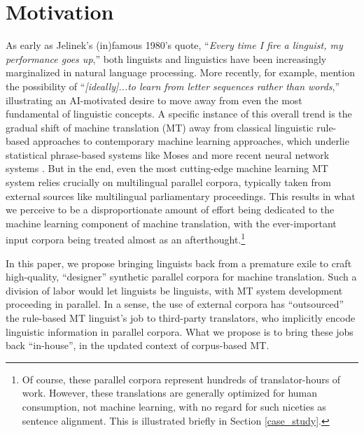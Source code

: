 \section{Motivation} 

As early as Jelinek's (in)famous 1980's quote, ``{\em Every time I fire a linguist, my performance goes up},'' both linguists and linguistics have been increasingly marginalized in natural language processing. 
More recently, for example,  mention the possibility of ``{\em [ideally]...to learn from letter sequences rather than words},'' illustrating an AI-motivated desire to move away from even the most fundamental of linguistic concepts.
A specific instance of this overall trend is the gradual shift of machine translation (MT) away from classical linguistic rule-based approaches  to contemporary machine learning approaches, which underlie statistical phrase-based systems like Moses  and more recent neural network systems .  
But in the end, even the most cutting-edge machine learning MT system relies crucially on multilingual parallel corpora, typically taken from external sources like multilingual parliamentary proceedings. 
This results in what we perceive to be a disproportionate amount of effort being dedicated to the machine learning component of machine translation, with the ever-important input corpora being treated almost as an afterthought.\footnote{
    Of course, these parallel corpora represent hundreds of translator-hours of work. 
    However, these translations are generally optimized for human consumption, not machine learning, with no regard for such niceties as sentence alignment.
    This is illustrated briefly in Section \ref{case_study}.
    }


In this paper, we propose bringing linguists back from a premature exile to craft high-quality, ``designer'' synthetic parallel corpora for machine translation.
Such a division of labor would let linguists be linguists, with MT system development proceeding in parallel.  
In a sense, the use of external corpora has ``outsourced'' the rule-based MT linguist's job to third-party translators, who implicitly encode linguistic information in parallel corpora.  
What we propose is to bring these jobs back ``in-house'', in the updated context of corpus-based MT.



